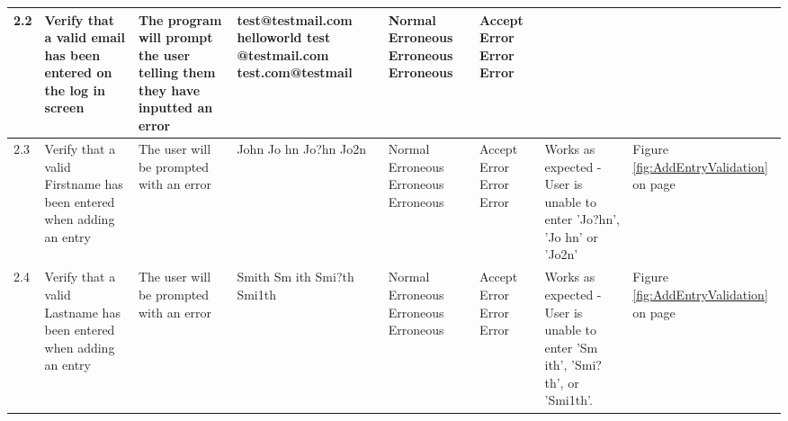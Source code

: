 \begin{landscape}
\begin{center}
\begin{longtable}{|p{1.5cm}|p{2cm}|p{2.5cm}|p{2.5cm}|p{2cm}|p{2cm}|p{2cm}|p{2cm}|}
\rowcolor{gray} 2.2 & Verify that a valid email has been entered on the log in screen &  The program will prompt the user telling them they have inputted an error & test@testmail.com \newline helloworld \newline test \newline @testmail.com \newline test.com@testmail & Normal \newline Erroneous \newline Erroneous \newline Erroneous & Accept \newline Error \newline Error \newline Error & & \\ \hline
        2.3 & Verify that a valid Firstname has been entered when adding an entry & The user will be prompted with an error & John \newline Jo hn \newline Jo?hn \newline Jo2n & Normal \newline Erroneous \newline Erroneous \newline Erroneous & Accept \newline Error \newline Error \newline Error & Works as expected - User is unable to enter 'Jo?hn', 'Jo hn' or 'Jo2n' & Figure \ref{fig:AddEntryValidation} on page \pageref{fig:AddEntryValidation} \\ \hline
        2.4 & Verify that a valid Lastname has been entered when adding an entry & The user will be prompted with an error & Smith \newline Sm ith \newline Smi?th \newline Smi1th & Normal \newline Erroneous \newline Erroneous \newline Erroneous & Accept \newline Error \newline Error \newline Error & Works as expected - User is unable to enter 'Sm ith', 'Smi?th', or 'Smi1th'. & Figure \ref{fig:AddEntryValidation} on page \pageref{fig:AddEntryValidation} \\ \hline

\end{longtable}
\end{center}
\end{landscape}
